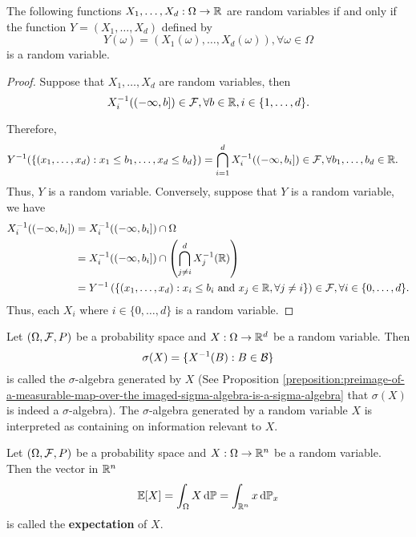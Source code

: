 \begin{proposition}
 The following functions $X_1,\ldots,X_d: \Omega\to\mathbb{R}$ are random variables if and only if the function $Y=(X_1,\ldots, X_d)$ defined by
 $$Y(\omega) = (X_1(\omega),\ldots, X_d(\omega)), \forall \omega\in\Omega$$
 is a random variable.
\end{proposition}

\begin{proof}
 Suppose that $X_1,\ldots,X_d$ are random variables, then
 $$X_i^{-1}((-\infty, b])\in \mathcal{F}, \forall b\in \mathbb{R}, i\in \{1,\ldots,d\}.$$

 Therefore,
 \begin{align*}
  Y^{-1}(\{(x_1,\ldots,x_d): x_1\le b_1,\ldots, x_d\le b_d\})
   & = \bigcap\limits_{i=1}^d X_i^{-1}((-\infty, b_i]) \in \mathcal{F}, \forall b_1,\ldots,b_d\in \mathbb{R}.
 \end{align*}
 Thus, $Y$ is a random variable. Conversely, suppose that $Y$ is a random variable, we have
 \begin{align*}
  X_i^{-1}((-\infty, b_i])
   & = X_i^{-1}((-\infty, b_i]) \cap \Omega                                                                                                 \\
   & = X_i^{-1}((-\infty, b_i]) \cap \left(\bigcap\limits_{j\ne i}^d X_j^{-1}(\mathbb{R})\right)                                                   \\
   & = Y^{-1}\left(\{(x_1,\ldots, x_d) : x_i \le b_i \text{ and } x_j \in \mathbb{R}, \forall j\ne i\}\right) \in \mathcal{F}, \forall i\in\{0,\ldots, d\}.
 \end{align*}
 Thus, each $X_i$ where $i\in\{0,\ldots, d\}$ is a random variable.
\end{proof}

\begin{definition}
 Let $(\Omega, \mathcal{F}, P)$ be a probability space and $X:\Omega\to\mathbb{R}^d$ be a random variable. Then
 $$\sigma(X)=\{X^{-1}(B) : B\in \mathcal{B}\}$$
 is called the $\sigma$-algebra generated by $X$ (See Proposition \ref{preposition:preimage-of-a-measurable-map-over-the imaged-sigma-algebra-is-a-sigma-algebra} that $\sigma(X)$ is indeed a $\sigma$-algebra). The $\sigma$-algebra generated by a random variable $X$ is interpreted as containing on information relevant to $X$.
\end{definition}

\begin{definition}
 Let $(\Omega, \mathcal{F}, P)$ be a probability space and $X:\Omega\to\mathbb{R}^n$ be a random variable. Then the vector in $\mathbb{R}^n$
 \begin{equation}
  \mathbb{E}[X]=\int_{\Omega}X\,\mathrm{d}\mathbb{P}=\int_{\mathbb{R}^n}x\,\mathrm{d} \mathbb{P}_x
 \end{equation}
 is called the \textbf{expectation} of $X$.
\end{definition}

